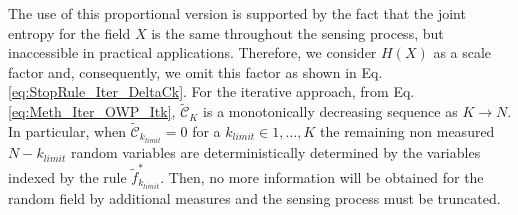 The use of this proportional version is supported by the fact that the joint entropy for the field $X$ is the same throughout the sensing process, but inaccessible in practical applications. Therefore, we consider $H(X)$ as a scale factor and, consequently, we omit this factor as shown in Eq. \eqref{eq:StopRule_Iter_DeltaCk}. For the iterative approach, from Eq. \eqref{eq:Meth_Iter_OWP_Itk}, $\mathcal{\tilde{C}}_{K}$ is a monotonically decreasing sequence as $K \rightarrow N$. In particular, when  $\mathcal{\tilde{C}}_{k_{limit}} = 0$ for a $k_{limit} \in {1, \ldots, K}$ the remaining non measured $N - k_{limit}$ random variables are deterministically determined by the variables indexed by the rule $\tilde{f}^{*}_{k_{limit}}$. Then, no more information will be obtained for the random field by additional measures and the sensing process must be truncated.






























